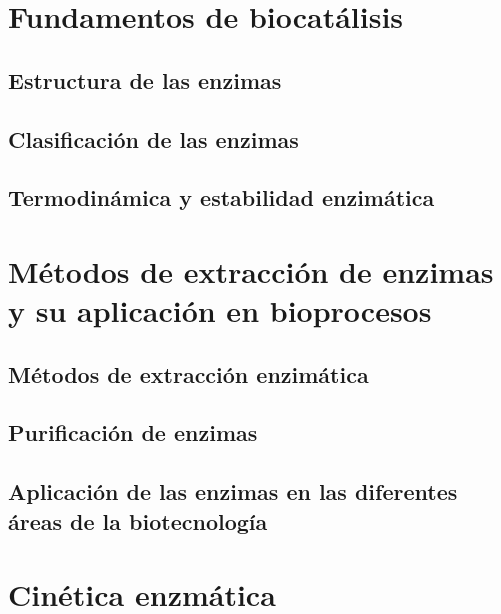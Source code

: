 \documentclass{../summarie}
\begin{document}
\frontmatter

    \Portada
    \tableofcontents
    \listoffigures
    \listoftables

\mainmatter
    
    \onehalfspacing
    \bibliographyunit[\chapter]


\part{Fundamentos de biocatálisis}

    \chapter{Estructura de las enzimas} 
    \chapter{Clasificación de las enzimas} 
    \chapter{Termodinámica y estabilidad enzimática} 
    
\part{Métodos de extracción de enzimas y su aplicación en bioprocesos}

    \chapter{Métodos de extracción enzimática} 
    \chapter{Purificación de enzimas} 
    \chapter{Aplicación de las enzimas en las diferentes áreas de la biotecnología}

\part{Cinética enzmática}
\end{document}
